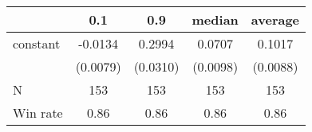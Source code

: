 \begin{tabular}{lcccc}
\hline
         &   0.1    &   0.9    &  median  & average   \\
\midrule
\midrule
constant & -0.0134  & 0.2994   & 0.0707   & 0.1017    \\
         & (0.0079) & (0.0310) & (0.0098) & (0.0088)  \\
N        & 153      & 153      & 153      & 153       \\
Win rate & 0.86     & 0.86     & 0.86     & 0.86      \\
\hline
\end{tabular}